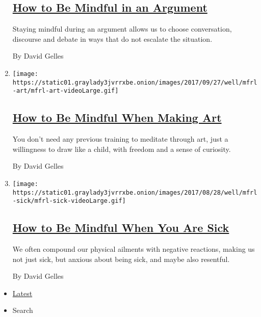 \begin{enumerate}
  \hypertarget{how-to-be-mindful-in-an-argument}{%
  \subsection{\texorpdfstring{\href{/2017/10/04/well/mind/how-to-be-mindful-in-an-argument.html}{How
  to Be Mindful in an
  Argument}}{How to Be Mindful in an Argument}}\label{how-to-be-mindful-in-an-argument}}

  Staying mindful during an argument allows us to choose conversation,
  discourse and debate in ways that do not escalate the situation.

  By David Gelles
\item
  \texttt{[image: https://static01.graylady3jvrrxbe.onion/images/2017/09/27/well/mfrl-art/mfrl-art-videoLarge.gif]}

  \hypertarget{how-to-be-mindful-when-making-art}{%
  \subsection{\texorpdfstring{\href{/2017/09/27/well/mind/how-to-be-mindful-when-making-art.html}{How
  to Be Mindful When Making
  Art}}{How to Be Mindful When Making Art}}\label{how-to-be-mindful-when-making-art}}

  You don't need any previous training to meditate through art, just a
  willingness to draw like a child, with freedom and a sense of
  curiosity.

  By David Gelles
\item
  \texttt{[image: https://static01.graylady3jvrrxbe.onion/images/2017/08/28/well/mfrl-sick/mfrl-sick-videoLarge.gif]}

  \hypertarget{how-to-be-mindful-when-you-are-sick}{%
  \subsection{\texorpdfstring{\href{/2017/09/20/well/mind/how-to-be-mindful-when-you-are-sick.html}{How
  to Be Mindful When You Are
  Sick}}{How to Be Mindful When You Are Sick}}\label{how-to-be-mindful-when-you-are-sick}}

  We often compound our physical ailments with negative reactions,
  making us not just sick, but anxious about being sick, and maybe also
  resentful.

  By David Gelles
\end{enumerate}

\begin{itemize}
\tightlist
\item
  \protect\hyperlink{stream-panel}{Latest}
\item
  Search
\end{itemize}


